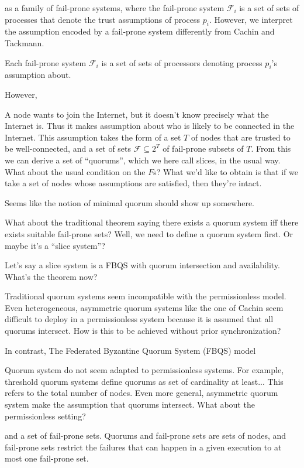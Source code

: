 \documentclass[11pt]{article}
\begin{document}
  as a family of
fail-prone systems, where the fail-prone system $\mathcal{F}_i$ is a set of
sets of processes that denote the trust assumptions of process $p_i$. However,
we interpret the assumption encoded by a fail-prone system differently from
Cachin and Tackmann.


Each fail-prone system $\mathcal{F}_i$ is a set of sets of
processors denoting process $p_i$'s assumption about.

However,

A node wants to join the Internet, but it doesn't know precisely what the
Internet is. Thus it makes assumption about who is likely to be connected in
the Internet. This assumption takes the form of a set $T$ of nodes that are
trusted to be well-connected, and a set of sets $\mathcal{F}\subseteq 2^{T}$ of
fail-prone subsets of $T$. From this we can derive a set of ``quorums'', which
we here call slices, in the usual way. What about the usual condition on the
$F$s? What we'd like to obtain is that if we take a set of nodes whose
assumptions are satisfied, then they're intact.

Seems like the notion of minimal quorum should show up somewhere.

What about the traditional theorem saying there exists a quorum system iff
there exists suitable fail-prone sets? Well, we need to define a quorum system
first. Or maybe it's a ``slice system''?

Let's say a slice system is a FBQS with quorum intersection and availability.
What's the theorem now?

Traditional quorum systems seem incompatible with the permissionless model. Even
heterogeneous, asymmetric quorum systems like the one of Cachin seem difficult
to deploy in a permissionless system because it is assumed that all quorums
intersect. How is this to be achieved without prior synchronization?

In contrast, The Federated Byzantine Quorum System (FBQS) model

Quorum system do not seem adapted to permissionless systems. For example,
threshold quorum systems define quorums as set of cardinality at least... This
refers to the total number of nodes. Even more general, asymmetric quorum
system make the assumption that quorums intersect.
What about the permissionless setting?

and a set of fail-prone sets.
Quorums and fail-prone sets are sets of nodes, and fail-prone sets restrict the
failures that can happen in a given execution to at most one fail-prone set.
\end{document}
